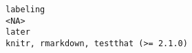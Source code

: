 \documentclass[
  letterpaper,
  DIV=11,
  numbers=noendperiod]{scrreprt}
\begin{document}
\begin{verbatim}
labeling                                                                                                                                                                                                                                                                                                                                                                                                                                                                                                                                                                                                                                                                                                                                                                                                                                                                                                                                                                                                                                                                                                                                                                                                                                                                                                 <NA>
later                                                                                                                                                                                                                                                                                                                                                                                                                                                                                                                                                                                                                                                                                                                                                                                                                                                                                                                                                                                                                                                                                                                                                                                                                                                                   knitr, rmarkdown, testthat (>= 2.1.0)

\end{verbatim}
\end{document}
